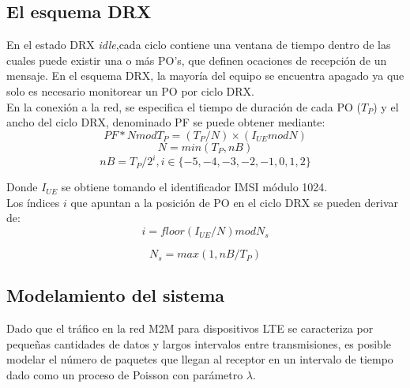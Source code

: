 \documentclass[journal]{IEEEtran}
\begin{document}
\subsection{El esquema DRX}

En el estado DRX \textit{idle},cada ciclo contiene una ventana de tiempo dentro de las cuales puede existir una o más PO's, que definen ocaciones de recepción de un mensaje. En el esquema DRX, la mayoría del equipo se encuentra apagado ya que solo es necesario monitorear un PO por ciclo DRX.\\

En la conexión a la red, se especifica el tiempo de duración de cada PO ($T_{P}$) y el ancho del ciclo DRX, denominado PF se puede obtener mediante:\\

\begin{equation}
PF*NmodT_{P}=(T_{P}/N)\times(I_{UE}modN)
\end{equation}
\begin{equation}
N=min(T_{P},nB)
\end{equation}
\begin{equation}
nB = T_{P}/2^i, i\in \lbrace-5,-4,-3,-2,-1,0,1,2\rbrace
\end{equation}

Donde $I_{UE}$ se obtiene tomando el identificador IMSI módulo 1024.\\

Los índices $i$ que apuntan a la posición de PO en el ciclo DRX se pueden derivar de:\\

\begin{equation}
i = floor(I_{UE}/N)modN_{s}
\end{equation}

\begin{equation}
N_{s} = max(1,nB/T_{P})
\end{equation}

\subsection{Modelamiento del sistema}

Dado que el tráfico en la red M2M para dispositivos LTE se caracteriza por pequeñas cantidades de datos y largos intervalos entre transmisiones, es posible modelar el número de paquetes que llegan al receptor en un intervalo de tiempo dado como un proceso de Poisson con parámetro $\lambda$.\\
\end{document}
